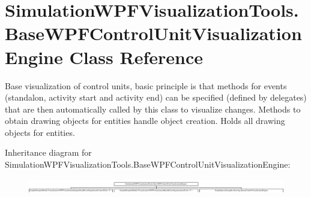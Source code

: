 \hypertarget{class_simulation_w_p_f_visualization_tools_1_1_base_w_p_f_control_unit_visualization_engine}{}\section{Simulation\+W\+P\+F\+Visualization\+Tools.\+Base\+W\+P\+F\+Control\+Unit\+Visualization\+Engine Class Reference}
\label{class_simulation_w_p_f_visualization_tools_1_1_base_w_p_f_control_unit_visualization_engine}


Base visualization of control units, basic principle is that methods for events (standalon, activity start and activity end) can be specified (defined by delegates) that are then automatically called by this class to visualize changes. Methods to obtain drawing objects for entities handle object creation. Holds all drawing objects for entities.  


Inheritance diagram for Simulation\+W\+P\+F\+Visualization\+Tools.\+Base\+W\+P\+F\+Control\+Unit\+Visualization\+Engine\+:\begin{figure}[H]
\begin{center}
\leavevmode
\includegraphics[height=0.645905cm]{class_simulation_w_p_f_visualization_tools_1_1_base_w_p_f_control_unit_visualization_engine}
\end{center}
\end{figure}
